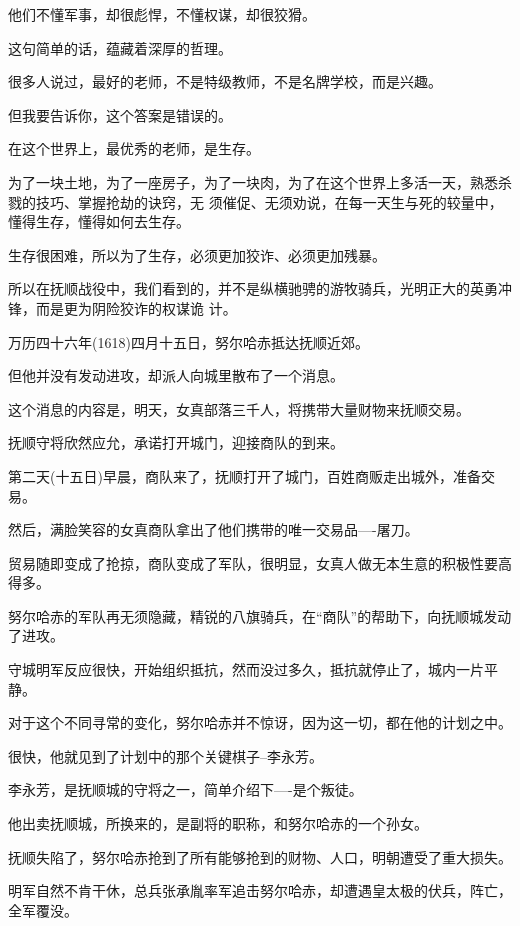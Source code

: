 \documentclass[11pt,a4paper,onecolumn]{article}
\begin{document}
他们不懂军事，却很彪悍，不懂权谋，却很狡猾。

这句简单的话，蕴藏着深厚的哲理。

很多人说过，最好的老师，不是特级教师，不是名牌学校，而是兴趣。

但我要告诉你，这个答案是错误的。

在这个世界上，最优秀的老师，是生存。

为了一块土地，为了一座房子，为了一块肉，为了在这个世界上多活一天，熟悉杀戮的技巧、掌握抢劫的诀窍，无
须催促、无须劝说，在每一天生与死的较量中，懂得生存，懂得如何去生存。

生存很困难，所以为了生存，必须更加狡诈、必须更加残暴。

所以在抚顺战役中，我们看到的，并不是纵横驰骋的游牧骑兵，光明正大的英勇冲锋，而是更为阴险狡诈的权谋诡
计。

万历四十六年(1618)四月十五日，努尔哈赤抵达抚顺近郊。

但他并没有发动进攻，却派人向城里散布了一个消息。

这个消息的内容是，明天，女真部落三千人，将携带大量财物来抚顺交易。

抚顺守将欣然应允，承诺打开城门，迎接商队的到来。

第二天(十五日)早晨，商队来了，抚顺打开了城门，百姓商贩走出城外，准备交易。

然后，满脸笑容的女真商队拿出了他们携带的唯一交易品----屠刀。

贸易随即变成了抢掠，商队变成了军队，很明显，女真人做无本生意的积极性要高得多。

努尔哈赤的军队再无须隐藏，精锐的八旗骑兵，在``商队''的帮助下，向抚顺城发动了进攻。

守城明军反应很快，开始组织抵抗，然而没过多久，抵抗就停止了，城内一片平静。

对于这个不同寻常的变化，努尔哈赤并不惊讶，因为这一切，都在他的计划之中。

很快，他就见到了计划中的那个关键棋子--李永芳。

李永芳，是抚顺城的守将之一，简单介绍下----是个叛徒。

他出卖抚顺城，所换来的，是副将的职称，和努尔哈赤的一个孙女。

抚顺失陷了，努尔哈赤抢到了所有能够抢到的财物、人口，明朝遭受了重大损失。

明军自然不肯干休，总兵张承胤率军追击努尔哈赤，却遭遇皇太极的伏兵，阵亡，全军覆没。

\section[\thesection]{}
\end{document}
